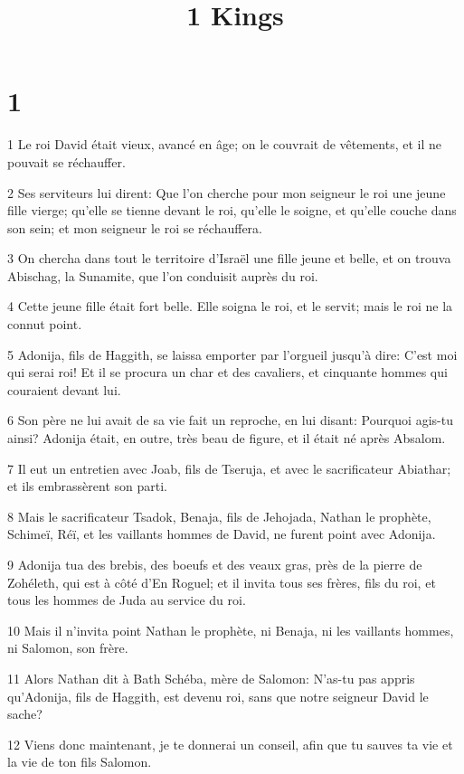 

\title{1 Kings}


\chapter{1}

\par 1 Le roi David était vieux, avancé en âge; on le couvrait de vêtements, et il ne pouvait se réchauffer.
\par 2 Ses serviteurs lui dirent: Que l'on cherche pour mon seigneur le roi une jeune fille vierge; qu'elle se tienne devant le roi, qu'elle le soigne, et qu'elle couche dans son sein; et mon seigneur le roi se réchauffera.
\par 3 On chercha dans tout le territoire d'Israël une fille jeune et belle, et on trouva Abischag, la Sunamite, que l'on conduisit auprès du roi.
\par 4 Cette jeune fille était fort belle. Elle soigna le roi, et le servit; mais le roi ne la connut point.
\par 5 Adonija, fils de Haggith, se laissa emporter par l'orgueil jusqu'à dire: C'est moi qui serai roi! Et il se procura un char et des cavaliers, et cinquante hommes qui couraient devant lui.
\par 6 Son père ne lui avait de sa vie fait un reproche, en lui disant: Pourquoi agis-tu ainsi? Adonija était, en outre, très beau de figure, et il était né après Absalom.
\par 7 Il eut un entretien avec Joab, fils de Tseruja, et avec le sacrificateur Abiathar; et ils embrassèrent son parti.
\par 8 Mais le sacrificateur Tsadok, Benaja, fils de Jehojada, Nathan le prophète, Schimeï, Réï, et les vaillants hommes de David, ne furent point avec Adonija.
\par 9 Adonija tua des brebis, des boeufs et des veaux gras, près de la pierre de Zohéleth, qui est à côté d'En Roguel; et il invita tous ses frères, fils du roi, et tous les hommes de Juda au service du roi.
\par 10 Mais il n'invita point Nathan le prophète, ni Benaja, ni les vaillants hommes, ni Salomon, son frère.
\par 11 Alors Nathan dit à Bath Schéba, mère de Salomon: N'as-tu pas appris qu'Adonija, fils de Haggith, est devenu roi, sans que notre seigneur David le sache?
\par 12 Viens donc maintenant, je te donnerai un conseil, afin que tu sauves ta vie et la vie de ton fils Salomon.

